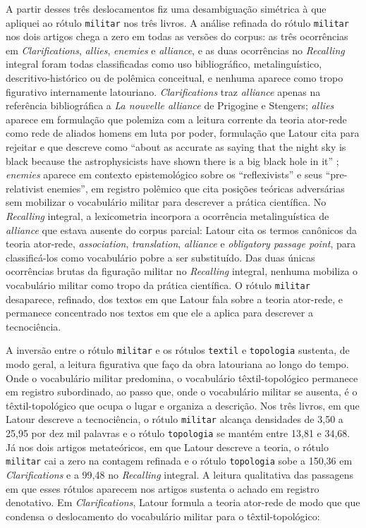 A partir desses três deslocamentos fiz uma desambiguação simétrica à que apliquei ao rótulo \texttt{militar} nos três livros. A análise refinada do rótulo \texttt{militar} nos dois artigos chega a zero em todas as versões do corpus: as três ocorrências em \emph{Clarifications}, \textit{allies}, \textit{enemies} e \textit{alliance}, e as duas ocorrências no \emph{Recalling} integral foram todas classificadas como uso bibliográfico, metalinguístico, descritivo-histórico ou de polêmica conceitual, e nenhuma aparece como tropo figurativo internamente latouriano. \emph{Clarifications} traz \textit{alliance} apenas na referência bibliográfica a \emph{La nouvelle alliance} de Prigogine e Stengers; \textit{allies} aparece em formulação que polemiza com a leitura corrente da teoria ator-rede como rede de aliados homens em luta por poder, formulação que Latour cita para rejeitar e que descreve como \enquote{about as accurate as saying that the night sky is black because the astrophysicists have shown there is a big black hole in it} \parencite[p.~5]{latour1996clarifications}; \textit{enemies} aparece em contexto epistemológico sobre os \enquote{reflexivists} e seus \enquote{pre-relativist enemies}, em registro polêmico que cita posições teóricas adversárias sem mobilizar o vocabulário militar para descrever a prática científica. No \emph{Recalling} integral, a lexicometria incorpora a ocorrência metalinguística de \textit{alliance} que estava ausente do corpus parcial: Latour cita os termos canônicos da teoria ator-rede, \textit{association}, \textit{translation}, \textit{alliance} e \textit{obligatory passage point}, para classificá-los como vocabulário pobre a ser substituído. Das duas únicas ocorrências brutas da figuração militar no \emph{Recalling} integral, nenhuma mobiliza o vocabulário militar como tropo da prática científica. O rótulo \texttt{militar} desaparece, refinado, dos textos em que Latour fala sobre a teoria ator-rede, e permanece concentrado nos textos em que ele a aplica para descrever a tecnociência.

A inversão entre o rótulo \texttt{militar} e os rótulos \texttt{textil} e \texttt{topologia} sustenta, de modo geral, a leitura figurativa que faço da obra latouriana ao longo do tempo. Onde o vocabulário militar predomina, o vocabulário têxtil-topológico permanece em registro subordinado, ao passo que, onde o vocabulário militar se ausenta, é o têxtil-topológico que ocupa o lugar e organiza a descrição. Nos três livros, em que Latour descreve a tecnociência, o rótulo \texttt{militar} alcança densidades de 3,50 a 25,95 por dez mil palavras e o rótulo \texttt{topologia} se mantém entre 13,81 e 34,68. Já nos dois artigos metateóricos, em que Latour descreve a teoria, o rótulo \texttt{militar} cai a zero na contagem refinada e o rótulo \texttt{topologia} sobe a 150,36 em \emph{Clarifications} e a 99,48 no \emph{Recalling} integral. A leitura qualitativa das passagens em que esses rótulos aparecem nos artigos sustenta o achado em registro denotativo. Em \emph{Clarifications}, Latour formula a teoria ator-rede de modo que que condensa o deslocamento do vocabulário militar para o têxtil-topológico: 

